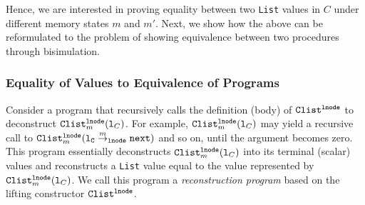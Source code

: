 Hence, we are interested in proving equality
between two {\tt List} values in $C$ under different memory states $m$ and $m'$.
Next, we show how the above can be reformulated to the problem of
showing equivalence between two procedures through bisimulation.



\subsubsection{Equality of Values to Equivalence of Programs}
\label{sec:recursiveEqToBisim}
Consider a program that recursively calls the definition (body) of
${\tt Clist}^{\tt lnode}$ to deconstruct
${\tt Clist}_m^{{\tt lnode}}({\tt l}_C)$.
For example,
${\tt Clist}_m^{{\tt lnode}}({\tt l}_C)$
may yield a recursive call
to ${\tt Clist}_m^{{\tt lnode}}({\tt {\tt l}_C} \overset{m}{\rightarrow}_{\tt lnode} {\tt next})$
and so on, until the argument becomes zero.
This program essentially deconstructs ${\tt Clist}_m^{{\tt lnode}}({\tt l}_C)$
into its terminal (scalar) values and reconstructs
a {\tt List} value equal to the value
represented by ${\tt Clist}_m^{{\tt lnode}}({\tt l}_C)$.
We call this program a {\em reconstruction program} based
on the lifting constructor
${\tt Clist}^{{\tt lnode}}$.

